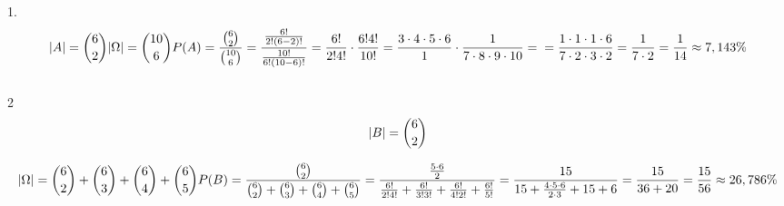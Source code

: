 1.\\
$$
|A| = {6\choose2}\\
|\Omega| = {10\choose 6}\\
P(A) = \frac{{6\choose2}}{{10\choose 6}} = \frac{\frac{6!}{2!(6-2)!}}{\frac{10!}{6!(10-6)!}}
= \frac{6!}{2!4!}\cdot\frac{6!4!}{10!} = \frac{3\cdot4\cdot5\cdot6}{1}\cdot\frac{1}{7\cdot8\cdot9\cdot10}=\\
=\frac{1\cdot1\cdot1\cdot6}{7\cdot2\cdot3\cdot2}=\frac{1}{7\cdot2}=\frac{1}{14}\approx7,143\%
\\
$$
\\2\\
$$
|B|={6\choose2}\\
$$

$$
|\Omega|={6\choose2}+{6\choose3}+{6\choose4}+{6\choose5}\\

P(B) = \frac{{6\choose2}}{{6\choose2}+{6\choose3}+{6\choose4}+{6\choose5}}=
\frac{\frac{5\cdot6}{2}}{\frac{6!}{2!4!}+\frac{6!}{3!3!}+\frac{6!}{4!2!}+\frac{6!}{5!}}=\\
\frac{15}{15+\frac{4\cdot5\cdot6}{2\cdot3}+15+6}
=\frac{15}{36+20}=\frac{15}{56}\approx26,786\%
$$

